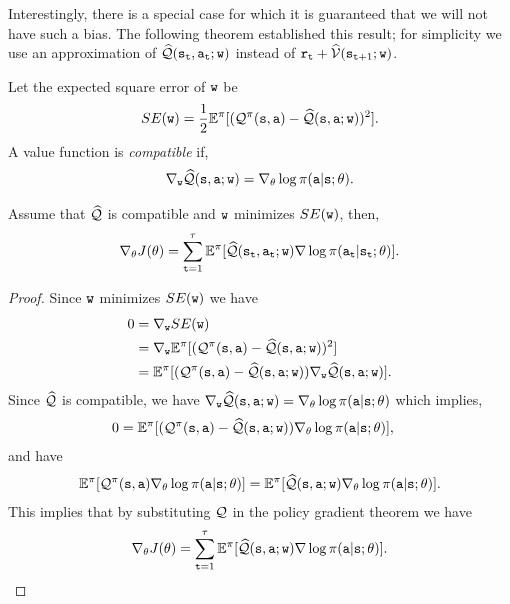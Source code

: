 Interestingly, there is a special case for which it is guaranteed
that we will not have such a bias. The following theorem established this result; for simplicity we use an approximation of $\widehat{\mathcal{Q}}({\tt s}_{{\tt t}}, {\tt a}_{{\tt t}};{\tt w})$ instead of ${\tt r}_{{\tt t}} + \widehat{\mathcal{V}}({\tt s}_{{\tt t}+1};{\tt w})$.

Let the expected square error of ${\tt w}$ be
\[
SE({\tt w})=\frac{1}{2}\mathbb{E}^\pi[(\mathcal{Q}^\pi({\tt s},{\tt a})-\widehat{\mathcal{Q}}({\tt s},{\tt a};{\tt w}))^2].
\]
A value function is {\em compatible} if,
\[
\nabla_{\tt w} \widehat{\mathcal{Q}}({\tt s},{\tt a};{\tt w})= \nabla_\theta
\log \pi({\tt a}|{\tt s};\theta).
\]


\begin{theorem}
Assume that $\widehat{\mathcal{Q}}$ is compatible and ${\tt w}$ minimizes $SE({\tt w})$,
then,
\[
\nabla_\theta J(\theta)=\sum_{{\tt t}=1}^\tau \mathbb{E}^\pi[\widehat{\mathcal{Q}}({\tt s}_{\tt t},{\tt a}_{\tt t};{\tt w})
\nabla \log \pi({\tt a}_{\tt t}|{\tt s}_{\tt t};\theta)].
\]
\end{theorem}

\begin{proof}
Since ${\tt w}$ minimizes $SE({\tt w})$ we have
\begin{align*}
0 & = \nabla_{\tt w} SE({\tt w})\\
&= \nabla_{\tt w} \mathbb{E}^\pi[(\mathcal{Q}^\pi({\tt s},{\tt a})-\widehat{\mathcal{Q}}({\tt s},{\tt a};{\tt w}))^2]\\
&=
\mathbb{E}^\pi[(\mathcal{Q}^\pi({\tt s},{\tt a})-\widehat{\mathcal{Q}}({\tt s},{\tt a};{\tt w}))\nabla_{\tt w}
\widehat{\mathcal{Q}}({\tt s},{\tt a};{\tt w})].
\end{align*}
Since $\widehat{\mathcal{Q}}$ is compatible, we have $\nabla_{\tt w}
\widehat{\mathcal{Q}}({\tt s},{\tt a};{\tt w})= \nabla_\theta \log
\pi({\tt a}|{\tt s};\theta)$ which implies,
\begin{align*}
0&=
\mathbb{E}^\pi[(\mathcal{Q}^\pi({\tt s},{\tt a})-\widehat{\mathcal{Q}}({\tt s},{\tt a};{\tt w}))\nabla_\theta
\log \pi({\tt a}|{\tt s};\theta)],
\end{align*}
and have
\begin{align*}
\mathbb{E}^\pi[\mathcal{Q}^\pi({\tt s},{\tt a})\nabla_\theta \log \pi({\tt a}|{\tt s};\theta)] = \mathbb{E}^\pi[\widehat{\mathcal{Q}}({\tt s},{\tt a};{\tt w})\nabla_\theta \log \pi({\tt a}|{\tt s};\theta)].
\end{align*}
This implies that by substituting $\mathcal{Q}$ in the policy gradient theorem
we have
\[
\nabla_\theta J(\theta) = \sum_{{\tt t}=1}^\tau \mathbb{E}^\pi[\widehat{\mathcal{Q}}({\tt s},{\tt a};{\tt w})
\nabla \log \pi({\tt a}|{\tt s};\theta)].
\]
\end{proof}

